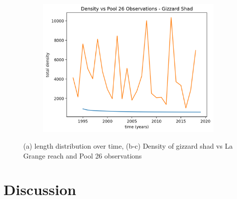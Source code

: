 \documentclass[11pt,oneside]{amsart}
\theoremstyle{definition}
\begin{document}
\begin{figure}
\begin{subfigure}[b]{.32\textwidth}
   \includegraphics[width=\textwidth]{figures/pool26.png}
     \caption{}
\label{fig:pool26}
\end{subfigure}
\caption{(a) length distribution over time, (b-c) Density of gizzard shad vs La Grange reach and Pool 26 observations}
\end{figure}    


\section{Discussion}

  
 
\end{document}
